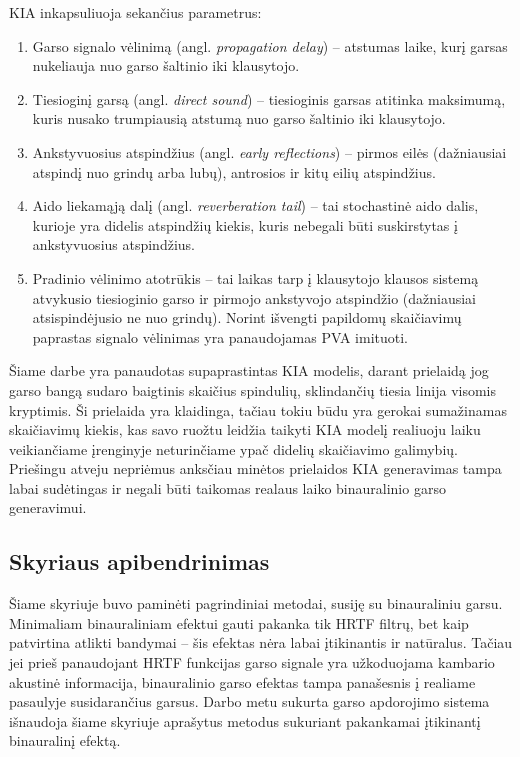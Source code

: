 \documentclass[]{vgtuef}
\begin{document}
KIA inkapsuliuoja sekančius parametrus:
\begin{enumerate}
  \item Garso signalo vėlinimą (angl. \textit{propagation delay}) – atstumas laike, kurį garsas nukeliauja nuo garso šaltinio iki klausytojo.
  \item Tiesioginį garsą (angl. \textit{direct sound}) – tiesioginis garsas atitinka maksimumą, kuris nusako trumpiausią atstumą nuo garso šaltinio iki klausytojo.
  \item Ankstyvuosius atspindžius (angl. \textit{early reflections}) – pirmos eilės (dažniausiai atspindį nuo grindų arba lubų), antrosios ir kitų eilių atspindžius.\item Aido liekamąją dalį (angl. \textit{reverberation tail}) – tai stochastinė aido dalis, kurioje yra didelis atspindžių kiekis, kuris nebegali būti suskirstytas į ankstyvuosius atspindžius.  
  \item Pradinio vėlinimo atotrūkis – tai laikas tarp į klausytojo klausos sistemą atvykusio tiesioginio garso ir pirmojo ankstyvojo atspindžio (dažniausiai atsispindėjusio ne nuo grindų). Norint išvengti papildomų skaičiavimų paprastas signalo vėlinimas yra panaudojamas PVA imituoti.
\end{enumerate}

Šiame darbe yra panaudotas supaprastintas KIA modelis, darant prielaidą jog garso bangą sudaro baigtinis skaičius spindulių, sklindančių tiesia linija visomis kryptimis. Ši prielaida yra klaidinga, tačiau tokiu būdu yra gerokai sumažinamas skaičiavimų kiekis, kas savo ruožtu leidžia taikyti KIA modelį realiuoju laiku veikiančiame įrenginyje neturinčiame ypač didelių skaičiavimo galimybių. Priešingu atveju nepriėmus anksčiau minėtos prielaidos KIA generavimas tampa labai sudėtingas ir negali būti taikomas realaus laiko binauralinio garso generavimui.


\subsection{Skyriaus apibendrinimas}

Šiame skyriuje buvo paminėti pagrindiniai metodai, susiję su binauraliniu garsu. Minimaliam binauraliniam efektui gauti pakanka tik HRTF filtrų, bet kaip patvirtina atlikti bandymai -- šis efektas nėra labai įtikinantis ir natūralus. Tačiau jei prieš panaudojant HRTF funkcijas garso signale yra užkoduojama kambario akustinė informacija, binauralinio garso efektas tampa panašesnis į realiame pasaulyje susidarančius garsus. 
Darbo metu sukurta garso apdorojimo sistema išnaudoja šiame skyriuje aprašytus metodus sukuriant pakankamai įtikinantį binauralinį efektą.
\end{document}
